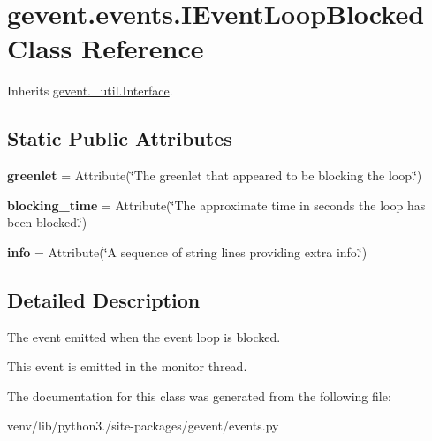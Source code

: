 \hypertarget{classgevent_1_1events_1_1_i_event_loop_blocked}{}\section{gevent.\+events.\+I\+Event\+Loop\+Blocked Class Reference}
\label{classgevent_1_1events_1_1_i_event_loop_blocked}


Inherits \hyperlink{classgevent_1_1__util_1_1_interface}{gevent.\+\_\+util.\+Interface}.

\subsection*{Static Public Attributes}
\begin{DoxyCompactItemize}
\item 
\mbox{\label{classgevent_1_1events_1_1_i_event_loop_blocked_ab9a0a66216828c6ff50f3deaa05cbb93}} 
{\bfseries greenlet} = Attribute(\char`\"{}The greenlet that appeared to be blocking the loop.\char`\"{})
\item 
\mbox{\label{classgevent_1_1events_1_1_i_event_loop_blocked_aac33c9f0a9aa39bb3ad8b976d1dd7275}} 
{\bfseries blocking\+\_\+time} = Attribute(\char`\"{}The approximate time in seconds the loop has been blocked.\char`\"{})
\item 
\mbox{\label{classgevent_1_1events_1_1_i_event_loop_blocked_a80b6e559b8409b07e9621832cb4ef0aa}} 
{\bfseries info} = Attribute(\char`\"{}A sequence of string lines providing extra info.\char`\"{})
\end{DoxyCompactItemize}


\subsection{Detailed Description}
\begin{DoxyVerb}The event emitted when the event loop is blocked.

This event is emitted in the monitor thread.
\end{DoxyVerb}
 

The documentation for this class was generated from the following file\+:\begin{DoxyCompactItemize}
\item 
venv/lib/python3./site-\/packages/gevent/events.\+py\end{DoxyCompactItemize}
